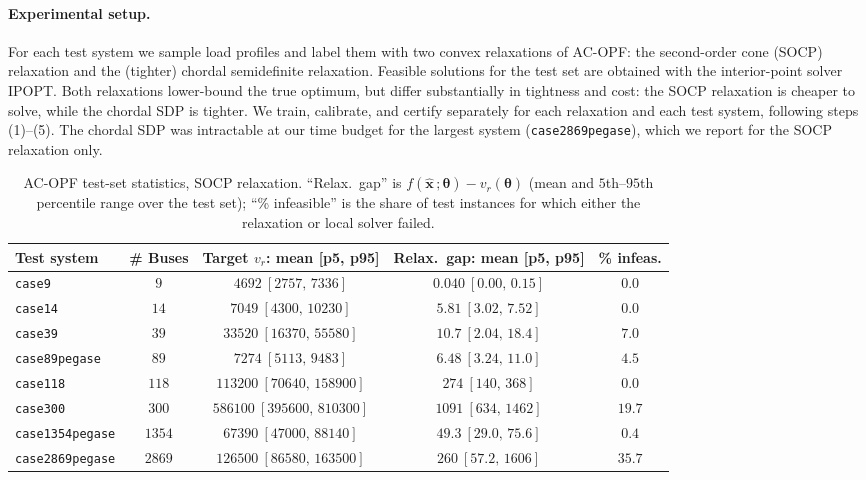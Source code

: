 \documentclass[10pt]{article} %
\theoremstyle{plain}
\theoremstyle{definition}
\theoremstyle{remark}
\begin{document}
\paragraph{Experimental setup.} For each test system we sample load profiles and label them with two convex relaxations of AC-OPF: the second-order cone (SOCP) relaxation and the (tighter) chordal semidefinite relaxation. Feasible solutions for the test set are obtained with the interior-point solver IPOPT. Both relaxations lower-bound the true optimum, but differ substantially in tightness and cost: the SOCP relaxation is cheaper to solve, while the chordal SDP is tighter. We train, calibrate, and certify separately for each relaxation and each test system, following steps (1)--(5). The chordal SDP was intractable at our time budget for the largest system (\texttt{case2869pegase}), which we report for the SOCP relaxation only.

\begin{table}[H]
\centering
\footnotesize
\caption{AC-OPF test-set statistics, SOCP relaxation. ``Relax.\ gap'' is $f(\hat{\mathbf{x}}\,;\bm{\theta}) - v_r(\bm{\theta})$ (mean and $5$th--$95$th percentile range over the test set); ``\% infeasible'' is the share of test instances for which either the relaxation or local solver failed.}
\begin{tabular}{lcccc}
\toprule
\textbf{Test system} & \textbf{\# Buses} & \textbf{Target } $v_r$\textbf{: mean [p5, p95]} & \textbf{Relax.\ gap: mean [p5, p95]} & \textbf{\% infeas.} \\
\midrule
\texttt{case9}          & $9$    & $4692\ [2757,\,7336]$          & $0.040\ [0.00,\,0.15]$    & $0.0$ \\
\texttt{case14}         & $14$   & $7049\ [4300,\,10230]$         & $5.81\ [3.02,\,7.52]$     & $0.0$ \\
\texttt{case39}         & $39$   & $33520\ [16370,\,55580]$       & $10.7\ [2.04,\,18.4]$     & $7.0$ \\
\texttt{case89pegase}   & $89$   & $7274\ [5113,\,9483]$          & $6.48\ [3.24,\,11.0]$     & $4.5$ \\
\texttt{case118}        & $118$  & $113200\ [70640,\,158900]$     & $274\ [140,\,368]$        & $0.0$ \\
\texttt{case300}        & $300$  & $586100\ [395600,\,810300]$    & $1091\ [634,\,1462]$      & $19.7$ \\
\texttt{case1354pegase} & $1354$ & $67390\ [47000,\,88140]$       & $49.3\ [29.0,\,75.6]$     & $0.4$ \\
\texttt{case2869pegase} & $2869$ & $126500\ [86580,\,163500]$     & $260\ [57.2,\,1606]$      & $35.7$ \\
\bottomrule
\end{tabular}
\label{tab:ACOPF-data-socp}
\end{table}
\end{document}
